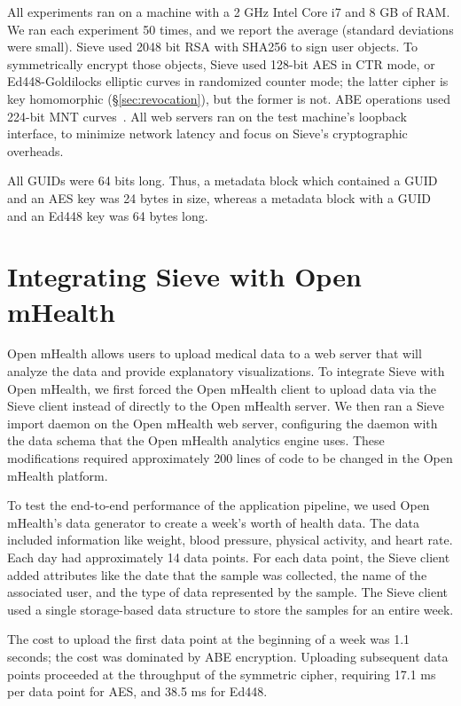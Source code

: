All experiments ran on a machine with a 2 GHz
Intel Core i7 and 8 GB of RAM. We ran each
experiment 50 times, and we report the average
(standard deviations were small).
Sieve used 2048 bit RSA with SHA256 to sign
user objects. To symmetrically encrypt those
objects, Sieve used 128-bit AES in CTR mode,
or Ed448-Goldilocks elliptic curves in randomized
counter mode; the latter cipher is key
homomorphic (\S\ref{sec:revocation}), but the
former is not. ABE operations used 224-bit MNT
curves~\cite{mnt224}. All web servers ran on the test
machine's loopback interface, to minimize
network latency and focus on Sieve's cryptographic
overheads.

All GUIDs were 64 bits long. Thus, a metadata
block which contained a GUID and an AES key
was 24 bytes in size, whereas a metadata block
with a GUID and an Ed448 key was 64 bytes long.

\section{Integrating Sieve with Open mHealth}
\label{sec:integration}
Open mHealth allows users to upload medical
data to a web server that will analyze the
data and provide explanatory visualizations.
To integrate Sieve with Open mHealth, we first 
forced the Open mHealth
client to upload data via the Sieve client
instead of directly to the Open mHealth server.
We then ran a Sieve import daemon on the Open
mHealth web server, configuring the daemon
with the data schema that the Open mHealth
analytics engine uses. These modifications
required approximately 200 lines of code
to be changed in the Open mHealth platform.

To test the end-to-end performance of the
application pipeline, we used Open mHealth's
data generator to create a week's worth of
health data. The data included information
like weight, blood pressure, physical activity,
and heart rate. Each day had approximately
14 data points. For each data point, the
Sieve client added attributes like the
date that the sample was collected, the
name of the associated user, and the type
of data represented by the sample. The Sieve
client used a single storage-based data 
structure to store the samples for an entire week.

The cost to upload the first data point
at the beginning of a week was 1.1 seconds;
the cost was dominated by ABE encryption.
Uploading subsequent data points proceeded
at the throughput of the symmetric cipher,
requiring 17.1 ms per data point for AES,
and 38.5 ms for Ed448.

